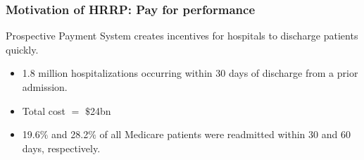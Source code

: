 \documentclass[ucs,9pt]{beamer}
\begin{document}




\begin{frame}
\frametitle{Motivation of HRRP: Pay for performance}
Prospective Payment System creates incentives for hospitals to discharge patients quickly.  
\pause
\begin{itemize}
\item 1.8 million hospitalizations occurring within 30 days of discharge from a prior admission.  
\item Total cost $=$ $\$$24bn 
\item  19.6$\%$ and 28.2$\%$ of all Medicare patients were readmitted within 30 and 60 days, respectively. 
\end{itemize}

\end{frame}
\end{document}
